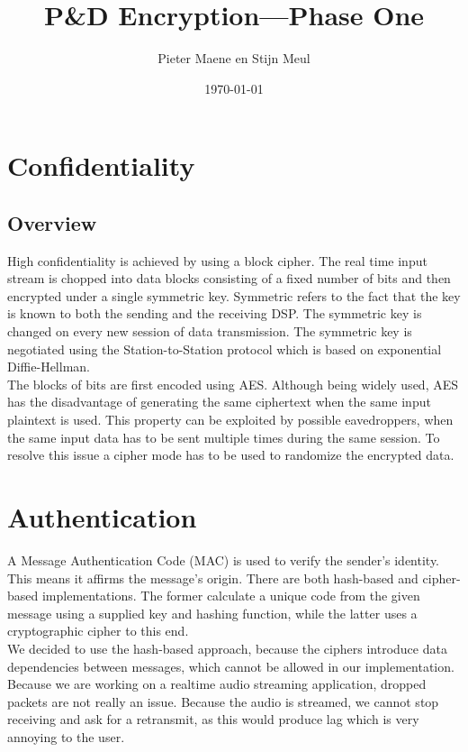 \documentclass[a4paper]{article}
\title{P\&D Encryption---Phase One}
\author{Pieter Maene en Stijn Meul}
\date{\today}
\begin{document}
\maketitle

\section{Confidentiality}

\subsection{Overview}
High confidentiality is achieved by using a block cipher. The real time input stream is chopped into data blocks consisting of a fixed number of bits and then encrypted under a single symmetric key. Symmetric refers to the fact that the key is known to both the sending and the receiving DSP. The symmetric key is changed on every new session of data transmission. The symmetric key is negotiated using the Station-to-Station protocol which is based on exponential Diffie-Hellman.\\

The blocks of bits are first encoded using AES. Although being widely used, AES has the disadvantage of generating the same ciphertext when the same input plaintext is used. This property can be exploited by possible eavedroppers, when the same input data has to be sent multiple times during the same session. To resolve this issue a cipher mode has to be used to randomize the encrypted data. 



\section{Authentication}

A Message Authentication Code (MAC) is used to verify the sender's identity. This means it affirms the message's origin. There are both hash-based and cipher-based implementations. The former calculate a unique code from the given message using a supplied key and hashing function, while the latter uses a cryptographic cipher to this end.\\

We decided to use the hash-based approach, because the ciphers introduce data dependencies between messages, which cannot be allowed in our implementation. Because we are working on a realtime audio streaming application, dropped packets are not really an issue. Because the audio is streamed, we cannot stop receiving and ask for a retransmit, as this would produce lag which is very annoying to the user.\\
\end{document}
